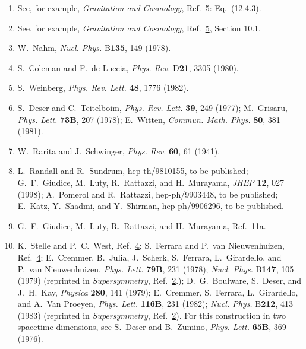 \begin{enumerate}
  \item {}\label{ch31-ref-6}
  See, for example, \textit{Gravitation and Cosmology},
  Ref.~\hyperref[ch31-ref-5]{5}: Eq.~(12.4.3).

  \item {}\label{ch31-ref-7}
  See, for example, \textit{Gravitation and Cosmology},
  Ref.~\hyperref[ch31-ref-5]{5}, Section 10.1.

  \item[7a.] \label{ch31-ref-7a}
  W.~Nahm, \textit{Nucl. Phys.} B\textbf{135}, 149 (1978).

  \item {}\label{ch31-ref-8}
  S.~Coleman and F.~de Luccia, \textit{Phys. Rev.} D\textbf{21}, 3305
  (1980).

  \item {}\label{ch31-ref-9}
  S.~Weinberg, \textit{Phys. Rev. Lett.} \textbf{48}, 1776 (1982).

  \item {}\label{ch31-ref-10}
  S.~Deser and C.~Teitelboim, \textit{Phys. Rev. Lett.} \textbf{39},
  249 (1977); M.~Grisaru, \textit{Phys. Lett.} \textbf{73B}, 207
  (1978); E.~Witten, \textit{Commun. Math. Phys.} \textbf{80}, 381
  (1981).

  \item {}\label{ch31-ref-11}
  W.~Rarita and J.~Schwinger, \textit{Phys. Rev.} \textbf{60}, 61
  (1941).

  \item[11a.] \label{ch31-ref-11a}
  L.~Randall and R.~Sundrum, hep-th/9810155, to be published;
  G.~F.~Giudice, M.~Luty, R.~Rattazzi, and H.~Murayama,
  \textit{JHEP} \textbf{12}, 027 (1998); A.~Pomerol and R.~Rattazzi,
  hep-ph/9903448, to be published; E.~Katz, Y.~Shadmi, and Y.~Shirman,
  hep-ph/9906296, to be published.

  \item[11b.] \label{ch31-ref-11b}
  G.~F.~Giudice, M.~Luty, R.~Rattazzi, and H.~Murayama,
  Ref.~\hyperref[ch31-ref-11a]{11a}.

  \item {}\label{ch31-ref-12}
  K.~Stelle and P.~C.~West, Ref.~\hyperref[ch31-ref-4]{4};
  S.~Ferrara and P.~van Nieuwenhuizen,
  Ref.~\hyperref[ch31-ref-4]{4}; E.~Cremmer, B.~Julia, J.~Scherk,
  S.~Ferrara, L.~Girardello, and P.~van Nieuwenhuizen,
  \textit{Phys. Lett.} \textbf{79B}, 231 (1978);
  \textit{Nucl. Phys.} B\textbf{147}, 105 (1979) (reprinted in
  \textit{Supersymmetry}, Ref.~\hyperref[ch31-ref-2]{2}.);
  D.~G.~Boulware, S.~Deser, and J.~H.~Kay, \textit{Physica}
  \textbf{280}, 141 (1979); E.~Cremmer, S.~Ferrara, L.~Girardello,
  and A.~Van Proeyen, \textit{Phys. Lett.} \textbf{116B}, 231 (1982);
  \textit{Nucl. Phys.} B\textbf{212}, 413 (1983) (reprinted in
  \textit{Supersymmetry}, Ref.~\hyperref[ch31-ref-2]{2}). For this
  construction in two spacetime dimensions, see S.~Deser and
  B.~Zumino, \textit{Phys. Lett.} \textbf{65B}, 369 (1976).


\end{enumerate}
